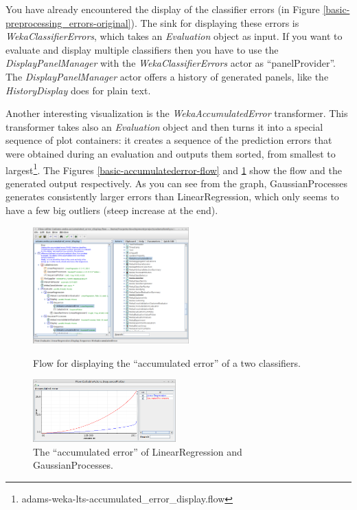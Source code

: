 You have already encountered the display of the classifier errors (in Figure
\ref{basic-preprocessing_errors-original}). The sink for displaying these errors
is \textit{WekaClassifierErrors}, which takes an \textit{Evaluation} object as
input. If you want to evaluate and display multiple classifiers then you have to
use the \textit{DisplayPanelManager} with the \textit{WekaClassifierErrors}
actor as ``panelProvider''. The \textit{DisplayPanelManager} actor offers a
history of generated panels, like the \textit{HistoryDisplay} does for plain
text.

Another interesting visualization is the \textit{WekaAccumulatedError}
transformer. This transformer takes also an \textit{Evaluation} object and then
turns it into a special sequence of plot containers: it creates a sequence of
the prediction errors that were obtained during an evaluation and outputs them
sorted, from smallest to
largest\footnote{adams-weka-lts-accumulated\_error\_display.flow}. The Figures
\ref{basic-accumulatederror-flow} and \ref{basic-accumulatederror-output} show
the flow and the generated output respectively. As you can see from the graph,
GaussianProcesses generates consistently larger errors than LinearRegression,
which only seems to have a few big outliers (steep increase at the end).

\begin{figure}[ht]
  \begin{minipage}[t]{0.5\linewidth}
    \centering
    \includegraphics[width=6.0cm]{images/basic-accumulatederror-flow.png}
    \caption{Flow for displaying the ``accumulated error'' of a two
    classifiers.}
    \label{basic-accumulatederror-flow}
  \end{minipage}
  \hspace{0.5cm}
  \begin{minipage}[t]{0.5\linewidth}
    \centering
    \includegraphics[width=5.5cm]{images/basic-accumulatederror-output.png}
    \caption{The ``accumulated error'' of LinearRegression and
    GaussianProcesses.}
    \label{basic-accumulatederror-output}
  \end{minipage}
\end{figure}


